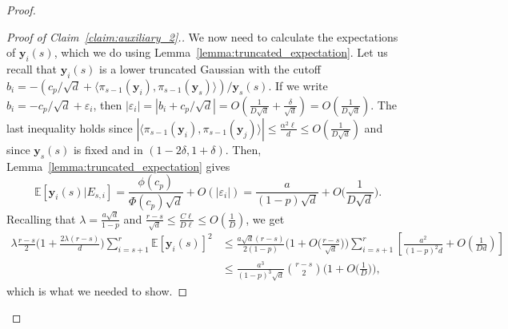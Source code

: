 \documentclass[10pt,a4paper]{amsart}
\def\bE{\mathbb{E}}
\def\by{\boldsymbol{y}}
\def\eps{\varepsilon}
\begin{document}
\begin{proof}
\begin{proof}[Proof of Claim~\ref{claim:auxiliary_2}.]
We now need to calculate the expectations of $\by_i(s)$, which we do using Lemma~\ref{lemma:truncated_expectation}. Let us recall that $\by_i(s)$ is a lower truncated Gaussian with the cutoff $b_i=-(c_p/\sqrt{d}+\langle \pi_{s-1}(\by_i), \pi_{s-1}(\by_s)\rangle)/\by_s(s)$. If we write $b_i=-c_p/\sqrt{d}+\eps_i$, then $|\eps_i|=|b_i+c_p/\sqrt{d}|=O(\frac{1}{D\sqrt{d}}+\frac{\delta}{\sqrt{d}})=O(\frac{1}{D\sqrt{d}})$. The last inequality holds since $|\langle \pi_{s-1}(\by_i), \pi_{s-1}(\by_j)\rangle|\leq \frac{\alpha^2\ell}{d}\leq O(\frac{1}{D\sqrt{d}})$ and since $\by_s(s)$ is fixed and in $(1-2\delta, 1+\delta)$. Then, Lemma~\ref{lemma:truncated_expectation} gives
{\smaller[0.3]
\[\bE[\by_i(s)|E_{s, i}]=\frac{\phi(c_p)}{\Phi(c_p)\sqrt{d}}\!+\!O(|\eps_i|)=\frac{a}{(1\!-\!p)\sqrt{d}}\!+\!O\Big(\frac{1}{D\sqrt{d}}\Big).\]
}
Recalling that $\lambda=\frac{a\sqrt{d}}{1-p}$ and $\frac{r-s}{\sqrt{d}}\leq \frac{C\ell}{D\ell}\leq O(\frac{1}{D})$, we get
{\smaller[0.3]
\begin{align*}
\lambda \frac{r\!-\!s}{2} \Big(1\!+\!\frac{2\lambda (r\!-\!s)}{d}\Big)\sum_{i=s+1}^r \bE[\by_i(s)]^2&\leq \frac{a\sqrt{d}(r\!-\!s)}{2(1\!-\!p)}\Big(1\!+\!O\Big(\frac{r\!-\!s}{\sqrt{d}}\Big)\Big)\sum_{i=s+1}^r \left[\frac{a^2}{(1\!-\!p)^2d}\!+\!O\left(\frac{1}{Dd}\right)\right]\\
&\leq \frac{a^3}{(1\!-\!p)^3\sqrt{d}}\binom{r\!-\!s}{2}\Big(1\!+\!O\big(\frac{1}{D}\big)\Big),
\end{align*}
}
which is what we needed to show.
\end{proof}
\let\qed\relax %
\end{proof}
\end{document}
